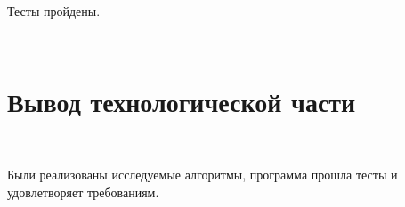 Тесты пройдены.

~\section{Вывод технологической части}\label{TechResults}~

Были реализованы исследуемые алгоритмы, программа прошла тесты и удовлетворяет требованиям.

